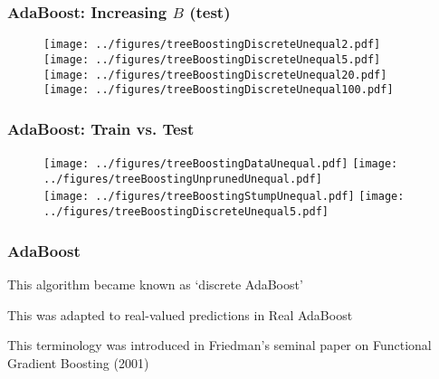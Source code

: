 \documentclass[12pt]{beamer}
\begin{document}
\begin{frame}[fragile]
\frametitle{AdaBoost: Increasing $B$ (test)}
\begin{figure}
\texttt{[image: ../figures/treeBoostingDiscreteUnequal2.pdf]}
\texttt{[image: ../figures/treeBoostingDiscreteUnequal5.pdf]} \\
\texttt{[image: ../figures/treeBoostingDiscreteUnequal20.pdf]}
\texttt{[image: ../figures/treeBoostingDiscreteUnequal100.pdf]}
\end{figure}
\end{frame}

\begin{frame}[fragile]
\frametitle{AdaBoost: Train vs. Test}
\begin{figure}
\texttt{[image: ../figures/treeBoostingDataUnequal.pdf]}
\texttt{[image: ../figures/treeBoostingUnprunedUnequal.pdf]} \\
\texttt{[image: ../figures/treeBoostingStumpUnequal.pdf]}
\texttt{[image: ../figures/treeBoostingDiscreteUnequal5.pdf]}
\end{figure}
\end{frame}


%
%

\begin{frame}[fragile]
\frametitle{AdaBoost}
This algorithm became known as `discrete AdaBoost'


\vsp
This was adapted to real-valued predictions in Real AdaBoost


\vsp
This terminology was introduced in Friedman's seminal paper on Functional Gradient Boosting (2001)
\end{frame}
\end{document}

